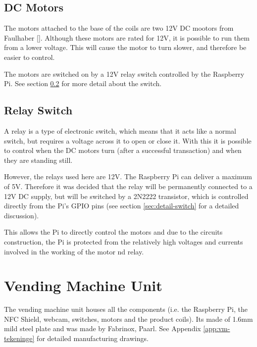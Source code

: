 \subsection{DC Motors}
\label{sec:dc-motor}

The motors attached to the base of the coils are two 12V DC mootors from Faulhaber
[\cite{website:dc-motors}]. Although these motors are rated for 12V, it is possible to run them
from a lower voltage. This will cause the motor to turn slower, and therefore be easier to
control. 

The motors are switched on by a 12V relay switch controlled by the Raspberry Pi. See section
\ref{sec:relay-switch} for more detail about the switch.

\subsection{Relay Switch}
\label{sec:relay-switch}

A relay is a type of electronic switch, which means that it acts like a normal switch, but
requires a voltage across it to open or close it. With this it is possible to control when the
DC motors turn (after a successful transaction) and when they are standing still. 

However, the relays used here are 12V. The Raspberry Pi can deliver a maximum of 5V. Therefore
it was decided that the relay will be permanently connected to a 12V DC supply, but will be
switched by a 2N2222 transistor, which is controlled directly from the Pi's  GPIO pins (see
section \ref{sec:detail-switch} for a detailed discussion).

This allows the Pi to directly control the motors and due to the circuits construction, the Pi
is protected from the relatively high voltages and currents involved in the working of the
motor nd relay.

\section{Vending Machine Unit}

The vending machine unit houses all the components (i.e. the Raspberry Pi, the NFC Shield,
webcam, switches, motors and the product coils). Its made of 1.6mm mild steel plate and was
made by Fabrinox, Paarl. See Appendix \ref{app:vm-tekeninge} for detailed manufacturing
drawings.

